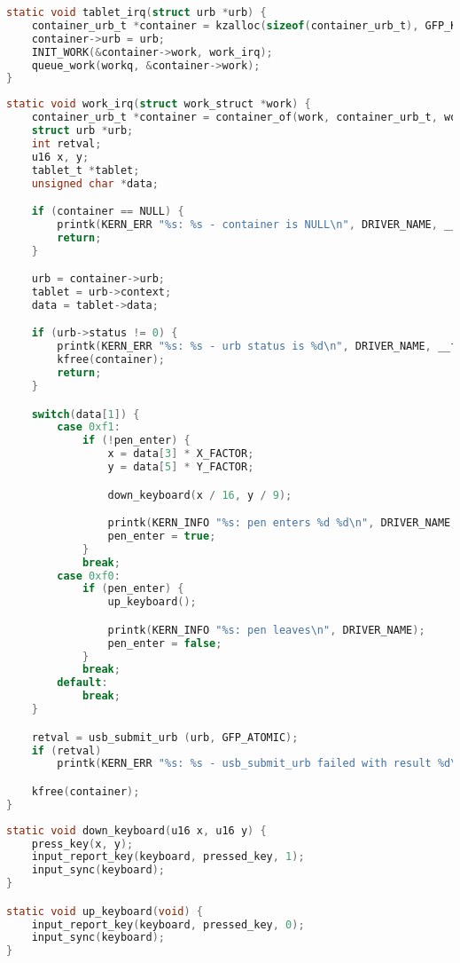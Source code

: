 \begin{lstlisting}[language=c,caption=Функция перехвата прерывания,label=lst:irq]
static void tablet_irq(struct urb *urb) {
    container_urb_t *container = kzalloc(sizeof(container_urb_t), GFP_KERNEL);
    container->urb = urb;
    INIT_WORK(&container->work, work_irq);
    queue_work(workq, &container->work);
}
\end{lstlisting}

\begin{lstlisting}[language=c,caption=Функция обработки прерывания,label=lst:work_irq]
static void work_irq(struct work_struct *work) {
    container_urb_t *container = container_of(work, container_urb_t, work);
    struct urb *urb;
    int retval;
    u16 x, y;
    tablet_t *tablet;
    unsigned char *data;

    if (container == NULL) {
        printk(KERN_ERR "%s: %s - container is NULL\n", DRIVER_NAME, __func__);
        return;
    }

    urb = container->urb;
    tablet = urb->context;
    data = tablet->data;

    if (urb->status != 0) {
        printk(KERN_ERR "%s: %s - urb status is %d\n", DRIVER_NAME, __func__, urb->status);
        kfree(container);
        return;
    }

    switch(data[1]) {
        case 0xf1:
            if (!pen_enter) {
                x = data[3] * X_FACTOR;
                y = data[5] * Y_FACTOR;

                down_keyboard(x / 16, y / 9);

                printk(KERN_INFO "%s: pen enters %d %d\n", DRIVER_NAME, x, y);
                pen_enter = true;
            }
            break;
        case 0xf0:
            if (pen_enter) {
                up_keyboard();

                printk(KERN_INFO "%s: pen leaves\n", DRIVER_NAME);
                pen_enter = false;
            }
            break;
        default:
            break;
    }

    retval = usb_submit_urb (urb, GFP_ATOMIC);
    if (retval)
        printk(KERN_ERR "%s: %s - usb_submit_urb failed with result %d\n", DRIVER_NAME, __func__, retval);

    kfree(container);
}
\end{lstlisting}

\begin{lstlisting}[language=c,caption=Функции нажатия и отжатия клавиши,label=lst:keydown_keyup]
static void down_keyboard(u16 x, u16 y) {
    press_key(x, y);
    input_report_key(keyboard, pressed_key, 1);
    input_sync(keyboard);
}

static void up_keyboard(void) {
    input_report_key(keyboard, pressed_key, 0);
    input_sync(keyboard);
}
\end{lstlisting}

